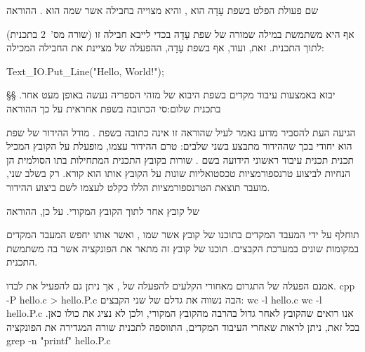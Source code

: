 שם פעולת הפלט בשפת עָדָה הוא , והיא מצוייה בחבילה אשר שמה הוא
. ההוראה

\begin{קוד}
\end{קוד}
(שורה מס'~2 בתכנית) אף היא משתמשת במילה שמורה של שפת עָדָה בכדי לייבא חבילה זו
    לתוך התכנית. זאת, ועוד, אף בשפת עָדָה, ההפעלה של  מציינת את החבילה
    המכילה:

\begin{קוד}
\begin{ADA}
Text_IO.Put_Line("Hello, World!");
\end{ADA}
\end{קוד}

§§ יבוא באמצעות עיבוד מקדים
בשפת  היבוא של מזהי הספריה נעשה באופן מעט אחר. ב תכנית שלום:סי הכתובה
בשפת  אחראית על כך ההוראה
\begin{קוד}
\end{קוד}
הגיעה העת להסביר מדוע נאמר לעיל שהוראה זו אינה כתובה בשפת . מודל ההידור של
שפת  הוא יחודי בכך שההידור מתבצע בשני שלבים: טרם ההידור עצמו, מופעלת על
הקובץ המכיל תכנית  תכנית עיבוד ראשוני הידועה בשם . שורות בקובץ התכנית המתחילות בתו הסולמית  הן הנחיות  לביצוע טרנספורמציות טכסטואליות שונות על הקובץ אותו הוא
קורא. רק בשלב שני, מועבר תוצאת הטרנספורמציות הללו כקלט ל עצמו לשם ביצוע
ההידור.

של קובץ אחר לתוך הקובץ המקורי. על כן, ההוראה
\begin{קוד}
\end{קוד}
תוחלף על ידי המעבד המקדים בתוכנו של קובץ אשר שמו , ואשר אותו יחפש
המעבד המקדים במקומות שונים במערכת הקבצים. תוכנו של קובץ זה מתאר את הפונקציה
 אשר בה משתמשת התכנית.

אמנם הפעלה של ה תגרום מאחורי הקלעים להפעלה של , אך ניתן גם להפעיל את  לבדו.
cpp -P hello.c > hello.P.c
\END
הבה נשווה את גדלם של שני הקבצים:
wc -l hello.c
\END
{}
wc -l hello.P.c
\END
אנו רואים שהקובץ לאחר  גדול בהרבה מהקובץ
המקורי, ולכן לא נציג את כולו כאן. בכל זאת, ניתן לראות שאחרי העיבוד המקדים,
התווספה לתכנית שורה המגדירה את הפונקציה 
grep -n "\<printf\>" hello.P.c
\END

